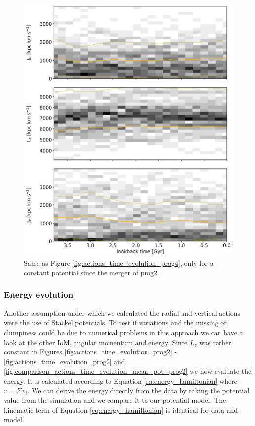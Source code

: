 \begin{figure}[htbp]
\captionsetup{format=plain}
    \centering
	\includegraphics[width=\textwidth]{plots/Dynamics/mean_pot/action_time_evolution_hist_mean_prog4.png}
    \caption{Same as Figure \ref{fig:actions_time_evolution_prog4}, only for a constant potential since the merger of prog2.}\label{fig:actions_time_evolution_mean_pot_prog4}
\end{figure}
\fi

\subsubsection{Energy evolution}\label{subsubsec:energy_evol}
Another assumption under which we calculated the radial and vertical actions were the use of St\"ackel potentials. To test if variations and the missing of clumpiness could be due to numerical problems in this approach we can have a look at the other \ac{IoM}, angular momentum and energy. Since $L_z$ was rather constant in Figures \ref{fig:actions_time_evolution_prog2} - \ref{fig:actions_time_evolution_prog2} and \ref{fig:comparison_actions_time_evolution_mean_pot_prog2} we now evaluate the energy. It is calculated according to Equation \ref{eq:energy_hamiltonian} where $v = \Sigma v_i$. We can derive the energy directly from the data by taking the potential value from the simulation and we compare it to our potential model. The kinematic term of Equation \ref{eq:energy_hamiltonian} is identical for data and model.

